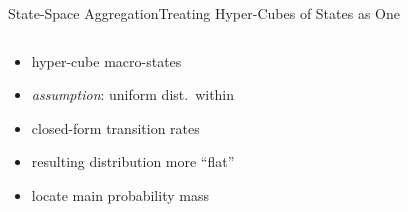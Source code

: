\documentclass{beamer}
\newcommand{\bottomcite}[1]{\vspace*{\fill} {\scriptsize \parencite{#1}}}
\begin{document}
\begin{frame}{State-Space Aggregation}{Treating Hyper-Cubes of States as One}
\begin{columns}
        \begin{column}{.6\textwidth}
            \begin{itemize}
                \item hyper-cube macro-states
                \item \emph{assumption}: uniform dist.\ within
                \item closed-form transition rates
            \end{itemize}
            \vspace{17mm}
            \begin{itemize}
                \item resulting distribution more ``flat''
                \item locate main probability mass
            \end{itemize}
            \vspace{4mm}
        \end{column}
    \end{columns}
    \bottomcite{backenkohler2020analysis,backenkohler2021abstraction}
\end{frame}
\end{document}
